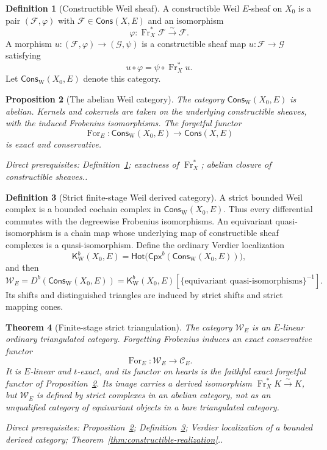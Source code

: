 \documentclass[10pt]{article}
\newtheorem{theorem}{Theorem}[section]
\newtheorem{proposition}[theorem]{Proposition}
\theoremstyle{definition}
\newtheorem{definition}[theorem]{Definition}
\newcommand{\Cons}{\mathsf{Cons}}
\newcommand{\FrX}{\operatorname{Fr}_X}
\newcommand{\depends}[1]{\par\smallskip\noindent\textit{Direct prerequisites:} #1.}
\begin{document}
\begin{definition}[Constructible Weil sheaf]\label{def:weil-sheaf}
A constructible Weil $E$-sheaf on $X_0$ is a pair
$(\mathcal F,\varphi)$ with $\mathcal F\in\Cons(X,E)$ and an isomorphism
\[
 \varphi:\FrX^*\mathcal F\xrightarrow{\sim}\mathcal F.
\]
A morphism
$u:(\mathcal F,\varphi)\to(\mathcal G,\psi)$ is a constructible sheaf map
$u:\mathcal F\to\mathcal G$ satisfying
\[
 u\circ\varphi=\psi\circ \FrX^*u.
\]
Let $\Cons_{\mathrm W}(X_0,E)$ denote this category.
\end{definition}

\begin{proposition}[The abelian Weil category]\label{prop:weil-abelian}
The category $\Cons_{\mathrm W}(X_0,E)$ is abelian.  Kernels and cokernels
are taken on the underlying constructible sheaves, with the induced
Frobenius isomorphisms.  The forgetful functor
\[
 \operatorname{For}_E:\Cons_{\mathrm W}(X_0,E)
 \longrightarrow\Cons(X,E)
\]
is exact and conservative.
\depends{Definition~\ref{def:weil-sheaf}; exactness of $\FrX^*$; abelian
closure of constructible sheaves.}
\end{proposition}

\begin{definition}[Strict finite-stage Weil derived category]
\label{def:strict-weil-derived}
A strict bounded Weil complex is a bounded cochain complex in
$\Cons_{\mathrm W}(X_0,E)$.  Thus every differential commutes with the
degreewise Frobenius isomorphisms.  An equivariant quasi-isomorphism is a
chain map whose underlying map of constructible sheaf complexes is a
quasi-isomorphism.  Define the ordinary Verdier localization
\[
 \mathsf K^b_{\mathrm W}(X_0,E)
 =\mathsf{Hot}\bigl(\mathsf{Cpx}^b(\Cons_{\mathrm W}(X_0,E))\bigr),
\]
and then
\[
 \mathcal W_E=D^b(\Cons_{\mathrm W}(X_0,E))
 =\mathsf K^b_{\mathrm W}(X_0,E)
   [\{\text{equivariant quasi-isomorphisms}\}^{-1}].
\]
Its shifts and distinguished triangles are induced by strict shifts and
strict mapping cones.
\end{definition}

\begin{theorem}[Finite-stage strict triangulation]
\label{thm:strict-weil-triangulated}
The category $\mathcal W_E$ is an $E$-linear ordinary triangulated category.
Forgetting Frobenius induces an exact conservative functor
\[
 \operatorname{For}_E:\mathcal W_E\longrightarrow\mathcal C_E.
\]
It is $E$-linear and $t$-exact, and its functor on hearts is the faithful
exact forgetful functor of Proposition~\ref{prop:weil-abelian}.
Its image carries a derived isomorphism $\FrX^*K\xrightarrow{\sim}K$, but
$\mathcal W_E$ is defined by strict complexes in an abelian category, not
as an unqualified category of equivariant objects in a bare triangulated
category.
\depends{Proposition~\ref{prop:weil-abelian};
Definition~\ref{def:strict-weil-derived}; Verdier localization of a bounded
derived category; Theorem~\ref{thm:constructible-realization}.}
\end{theorem}
\end{document}
